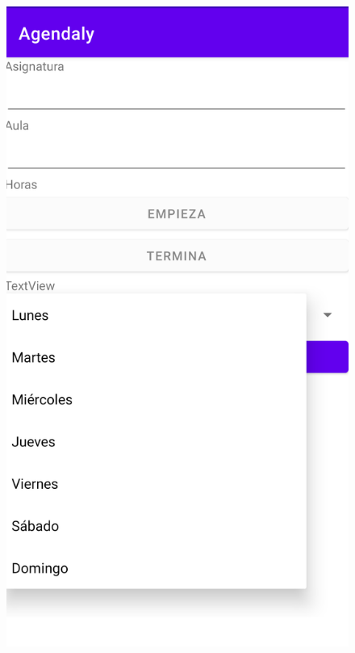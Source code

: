 \documentclass[a4paper,openright,12pt]{article}
\begin{document}
\begin{figure}
            \includegraphics[scale=0.05]{add_spinner.png}

\end{figure}
\end{document}

